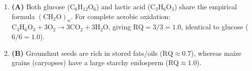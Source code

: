 \documentclass[11pt, a4paper]{article}
\begin{document}
\begin{enumerate}[label=\textbf{\arabic*.}]
\item \textbf{(A)} Both glucose ($\text{C}_6\text{H}_{12}\text{O}_6$) and lactic acid ($\text{C}_3\text{H}_6\text{O}_3$) share the empirical formula $(\text{CH}_2\text{O})_n$. For complete aerobic oxidation: $\text{C}_3\text{H}_6\text{O}_3 + 3\text{O}_2 \rightarrow 3\text{CO}_2 + 3\text{H}_2\text{O}$, giving $\text{RQ} = 3/3 = \mathbf{1.0}$, identical to glucose ($6/6 = 1.0$).

\item \textbf{(B)} Groundnut seeds are rich in stored fats/oils ($\text{RQ} \approx 0.7$), whereas maize grains (caryopses) have a large starchy endosperm ($\text{RQ} \approx 1.0$).

\end{enumerate}
\end{document}
